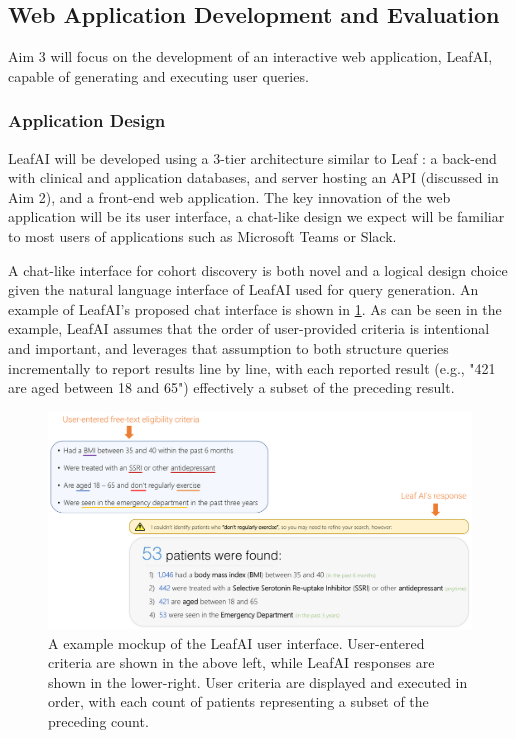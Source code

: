 \documentclass[../main.tex]{subfiles}
\begin{document}
\subsection{Web Application Development and Evaluation}

Aim 3 will focus on the development of an interactive web application, LeafAI, capable of generating and executing user queries. 

\subsubsection{Application Design}

LeafAI will be developed using a 3-tier architecture similar to Leaf \cite{dobbins2019leaf}: a back-end with clinical and application databases, and server hosting an API (discussed in Aim 2), and a front-end web application. The key innovation of the web application will be its user interface, a chat-like design we expect will be familiar to most users of applications such as Microsoft Teams or Slack.

A chat-like interface for cohort discovery is both novel and a logical design choice given the natural language interface of LeafAI used for query generation. An example of LeafAI's proposed chat interface is shown in \ref{aim3_fig_demo}. As can be seen in the example, LeafAI assumes that the order of user-provided criteria is intentional and important, and leverages that assumption to both structure queries incrementally to report results line by line, with each reported result (e.g., "421 are aged between 18 and 65") effectively a subset of the preceding result.

\begin{figure}[h!]
  \includegraphics[scale=0.58]{Figures/Aim3/aim3_demo.pdf}  
  \caption{A example mockup of the LeafAI user interface. User-entered criteria are shown in the above left, while LeafAI responses are shown in the lower-right. User criteria are displayed and executed in order, with each count of patients representing a subset of the preceding count.}
\label{aim3_fig_demo}
\end{figure}
\end{document}
